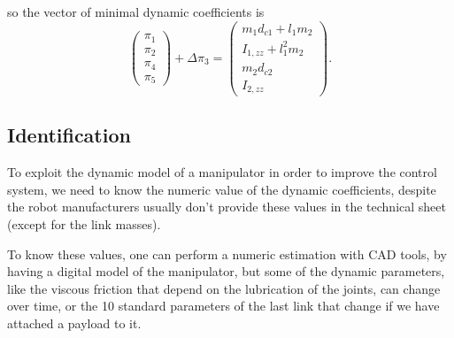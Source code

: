 \documentclass[10pt, a4paper]{report}
\begin{document}
so the vector of minimal dynamic coefficients is \begin{equation}
    \begin{pmatrix}
        \pi_1\\\pi_2\\\pi_4\\\pi_5
    \end{pmatrix}+\Delta\pi_3=\begin{pmatrix}
        m_1d_{c1}+l_1m_2\\
        I_{1,zz}+l_1^2m_2\\
        m_2{d_{c2}}\\
        I_{2,zz}
    \end{pmatrix}.
\end{equation}
\subsection{Identification}\label{Identification}
To exploit the dynamic model of a manipulator in order to improve the control system, we need to know the numeric value of the dynamic coefficients, despite the robot manufacturers usually don't provide these values in the technical sheet (except for the link masses).

To know these values, one can perform a numeric estimation with CAD tools, by having a digital model of the manipulator, but some of the dynamic parameters, like the viscous friction that depend on the lubrication of the joints, can change over time, or the 10 standard parameters of the last link that change if we have attached a payload to it.
\end{document}
